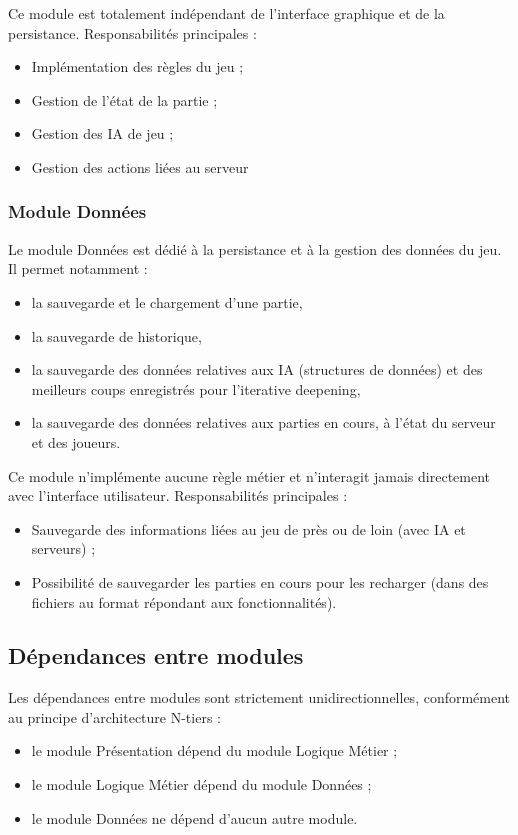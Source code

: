 \documentclass[a4paper]{article}
\begin{document}
Ce module est totalement indépendant de l’interface graphique et de la persistance.
Responsabilités principales :

\begin{itemize}
  \item Implémentation des règles du jeu ;
  \item Gestion de l’état de la partie ;
  \item Gestion des IA de jeu ;
  \item Gestion des actions liées au serveur
\end{itemize}

\subsubsection{Module Données}
Le module Données est dédié à la persistance et à la gestion des données du jeu.
Il permet notamment :
\begin{itemize}
  \item la sauvegarde et le chargement d’une partie,
  \item la sauvegarde de historique,
  \item la sauvegarde des données relatives aux IA (structures de données) et des meilleurs coups enregistrés pour l’iterative deepening,
  \item la sauvegarde des données relatives aux parties en cours, à l’état du serveur et des joueurs.
\end{itemize}

Ce module n’implémente aucune règle métier et n’interagit jamais directement avec l’interface utilisateur.
Responsabilités principales :
\begin{itemize}
  \item Sauvegarde des informations liées au jeu de près ou de loin (avec IA et serveurs) ;
  \item Possibilité de sauvegarder les parties en cours pour les recharger (dans des fichiers au format répondant aux fonctionnalités).
\end{itemize}

\subsection{Dépendances entre modules}
Les dépendances entre modules sont strictement unidirectionnelles, conformément au principe d’architecture N-tiers :
\begin{itemize}
  \item le module Présentation dépend du module Logique Métier ;
  \item le module Logique Métier dépend du module Données ;
  \item le module Données ne dépend d’aucun autre module.
\end{itemize}
\end{document}
